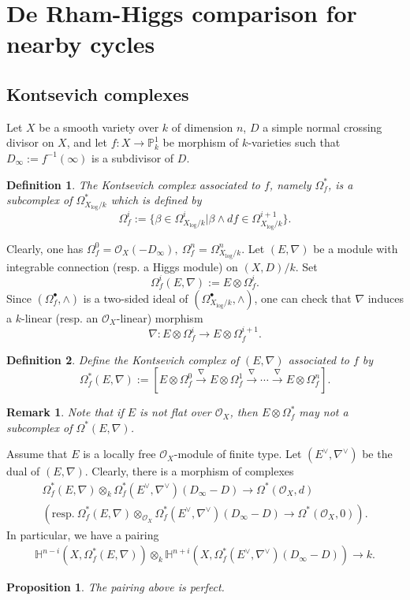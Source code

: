 \documentclass[12pt, a4paper]{article}
\newtheorem{definition}{Definition}[section]
\newtheorem{proposition}{Proposition}[section]
\newtheorem{remark}{Remark}[section]
\begin{document}
\section{De Rham-Higgs comparison for nearby cycles}

\subsection{Kontsevich complexes}
Let $X$ be a smooth variety over $k$ of dimension $n$, $D$ a simple normal crossing divisor on $X$, and let $f:X\to\mathbb P^1_k$ be morphism of $k$-varieties such that $D_\infty:=f^{-1}(\infty)$ is a subdivisor of $D$.
\begin{definition}\label{Kontsevich complex}
The Kontsevich complex associated to $f$, namely $\Omega^*_f$, is a subcomplex of $\Omega_{X_{\log}/k}^*$ which is defined by
$$
\Omega^i_f:=\{\beta\in\Omega_{X_{\log}/k}^i|\beta\wedge df\in\Omega_{X_{\log}/k}^{i+1}\}.
$$
\end{definition}
Clearly, one has $\Omega^0_f=\mathcal O_X(-D_\infty),~\Omega^n_f=\Omega^n_{X_{\log}/k}$.
Let $(E,\nabla)$ be a module with integrable connection (resp. a Higgs module) on $(X,D)/k$.
Set
$$
\Omega^i_f(E,\nabla):=E\otimes \Omega^i_f.
$$
Since $(\Omega^\bullet_f,\wedge)$ is a two-sided ideal of $(\Omega^\bullet_{X_{\log}/k},\wedge)$, one can check that $\nabla$ induces a $k$-linear (resp. an $\mathcal O_X$-linear) morphism
$$
\nabla:E\otimes\Omega^i_f\to E\otimes\Omega^{i+1}_f.
$$
\begin{definition}
Define the Kontsevich complex of $(E,\nabla)$ associated to $f$ by
$$
\Omega_f^*(E,\nabla):=[E\otimes\Omega^0_f\stackrel{\nabla}{\longrightarrow}E\otimes\Omega^1_f\stackrel{\nabla}{\longrightarrow}\cdots\stackrel{\nabla}{\longrightarrow}E\otimes\Omega^n_f].
$$
\end{definition}
\begin{remark}Note that if $E$ is not flat over $\mathcal O_X$, then $E\otimes\Omega^*_f$ may not a subcomplex of $\Omega^*(E,\nabla)$. 
\end{remark}
Assume that $E$ is a locally free $\mathcal O_X$-module of finite type. Let $(E^\vee,\nabla^\vee)$ be the dual of $(E,\nabla)$. Clearly, there is a morphism of complexes
$$
\begin{array}{c}
\Omega_f^*(E,\nabla)\otimes_k\Omega_f^*(E^\vee,\nabla^\vee)(D_\infty-D)\to\Omega^*(\mathcal O_X,d)\\
(\mathrm{resp}.~\Omega_f^*(E,\nabla)\otimes_{\mathcal O_X}\Omega_f^*(E^\vee,\nabla^\vee)(D_\infty-D)\to\Omega^*(\mathcal O_X,0)).
\end{array}
$$
In particular, we have a pairing 
$$
\begin{array}{c}
\mathbb H^{n-i}(X,\Omega_f^*(E,\nabla))\otimes_k\mathbb H^{n+i}(X,\Omega_f^*(E^\vee,\nabla^\vee)(D_\infty-D))\to k.
\end{array}
$$
\begin{proposition}
The pairing above is perfect.
\end{proposition}
\end{document}
